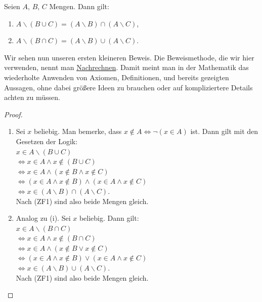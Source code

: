 \begin{lemma}
    Seien $A$, $B$, $C$ Mengen. Dann gilt:
    \begin{enumerate}
        \item $A \backslash (B \cup C) = (A \backslash B) \cap (A \backslash C)$,
        \item $A \backslash (B \cap C) = (A \backslash B) \cup (A \backslash C)$.
    \end{enumerate}
\end{lemma}
Wir sehen nun unseren ersten kleineren Beweis. Die Beweismethode, die wir hier verwenden, nennt man \underline{Nachrechnen}. Damit meint man in der Mathematik das wiederholte Anwenden von Axiomen, Definitionen, und bereits gezeigten Aussagen, ohne dabei größere Ideen zu brauchen oder auf kompliziertere Details achten zu müssen.
\begin{proof}
    \begin{enumerate}
        \item Sei $x$ beliebig. Man bemerke, dass $x \notin A \iff \neg (x \in A)$ ist. Dann gilt mit den Gesetzen der Logik:\\
        $x \in A \backslash (B \cup C)$\\
        $\iff x \in A \land x \notin (B \cup C)$\\
        $\iff x \in A \land (x \notin B \land x \notin C)$\\
        $\iff (x \in A \land x \notin B) \land (x \in A \land x \notin C)$\\
        $\iff x \in (A \backslash B) \cap (A \backslash C)$.\\
        Nach (ZF1) sind also beide Mengen gleich.
        \item Analog zu (i). Sei $x$ beliebig. Dann gilt:\\
        $x \in A \backslash (B \cap C)$\\
        $\iff x \in A \land x \notin (B \cap C)$\\
        $\iff x \in A \land (x \notin B \lor x \notin C)$\\
        $\iff (x \in A \land x \notin B) \lor (x \in A \land x \notin C)$\\
        $\iff x \in (A \backslash B) \cup (A \backslash C)$.\\
        Nach (ZF1) sind also beide Mengen gleich.
    \end{enumerate}
\end{proof}




